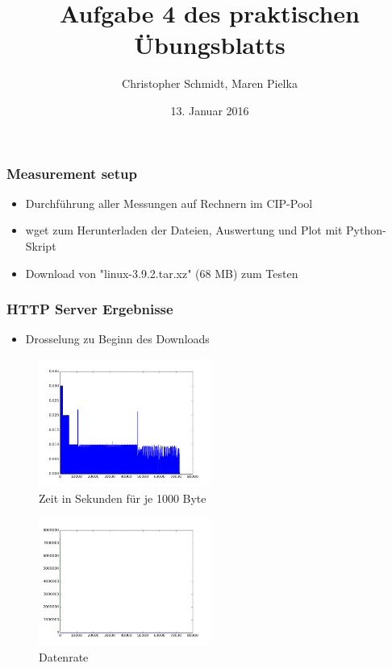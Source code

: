 \documentclass[handout]{beamer}
\title[Aufgabe 4]{Aufgabe 4 des praktischen Übungsblatts}
\author[Schmidt, Pielka]{Christopher Schmidt, Maren Pielka}
\institute[Uni Bonn]{Universität Bonn}
\date[13.01.15]{13. Januar 2016}
\begin{document}
\begin{frame}
\titlepage
\end{frame}

\begin{frame}
\frametitle{Measurement setup}
\begin{itemize}
\item Durchführung aller Messungen auf Rechnern im CIP-Pool
\item wget zum Herunterladen der Dateien, Auswertung und Plot mit Python-Skript
\item Download von "linux-3.9.2.tar.xz" (68 MB) zum Testen 
\end{itemize}
\end{frame}

\begin{frame}
\frametitle{HTTP Server Ergebnisse}
\begin{itemize}
\item Drosselung zu Beginn des Downloads
\end{itemize}
\begin{figure}
\centering
\includegraphics[width=0.5\textwidth]{seconds_http.png}
\caption{Zeit in Sekunden für je 1000 Byte}
\end{figure}
\end{frame}

\begin{frame}
\begin{figure}
\centering
\includegraphics[width=0.5\textwidth]{datarate_http.png}
\caption{Datenrate}
\end{figure}
\end{frame}
\end{document}
